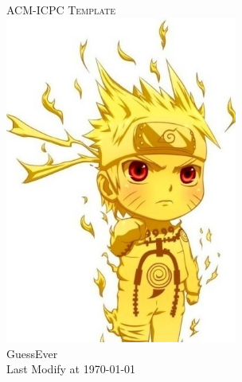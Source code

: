 \begin{center}
	\pagestyle{empty}
	~\\[100pt]
	\fontsize{48pt}{\baselineskip}\selectfont \textsc{ACM-ICPC Template}\\[80pt]
	\includegraphics[width=3in]{./logo.jpg}
	~\\[50pt]
	\Huge GuessEver \\[20pt]
	\Large Last Modify at \today\\
	\clearpage
\end{center}
